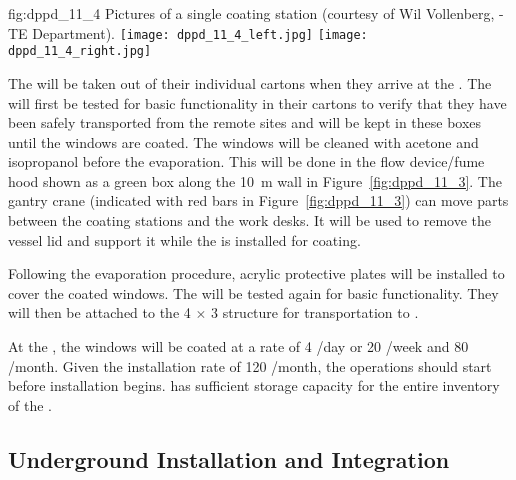 \begin{dunefigure}{fig:dppd_11_4}
{Pictures of a single  coating station (courtesy of Wil Vollenberg, -TE Department).}
\texttt{[image: dppd\_11\_4\_left.jpg]}
\texttt{[image: dppd\_11\_4\_right.jpg]}
\end{dunefigure}

The  will be taken out of their individual cartons when they arrive at the . The  will first be tested for basic functionality in their cartons to verify that they have been safely transported from the remote sites and will be kept in these boxes until the windows are coated. The  windows will be cleaned with acetone and isopropanol before the evaporation. This will be done in the flow device/fume hood shown as a green box along the \SI{10}{\m} wall in Figure~\ref{fig:dppd_11_3}. The gantry crane (indicated with red bars in Figure~\ref{fig:dppd_11_3}) can move parts between the coating stations and the work desks. It will be used to remove the vessel lid and support it while the  is installed for coating.

Following the evaporation procedure, acrylic protective plates will be installed to cover the coated  windows.
The  will be tested again for basic functionality. They will then be attached to the \num{4} $\times$ \num{3} structure for transportation to \surf.

At the , the  windows will be coated at a rate of \num{4} /day or \num{20} /week and \num{80} /month. Given the installation rate of \num{120} /month, the  operations should start before installation begins.  has sufficient storage capacity for the entire  inventory of the . 

\subsection{Underground Installation and Integration}
\label{subsec:dp-pds-undergroundinstallation}

